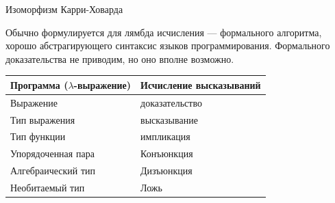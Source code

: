 \documentclass[aspectratio=169]{beamer}
\begin{document}
\begin{frame}{Изоморфизм Карри-Ховарда}

Обычно формулируется для лямбда исчисления --- формального алгоритма, хорошо
абстрагирующего синтаксис языков программирования. 
Формального доказательства
не приводим, но оно вполне возможно.

\begin{center}\begin{tabular}{ll}
Программа ($\lambda$-выражение) & Исчисление высказываний\\\hline
Выражение & доказательство\\
Тип выражения & высказывание\\
Тип функции & импликация\\
Упорядоченная пара & Конъюнкция\\
Алгебраический тип & Дизъюнкция\\
Необитаемый тип & Ложь
\end{tabular}\end{center}

\end{frame}
\end{document}
